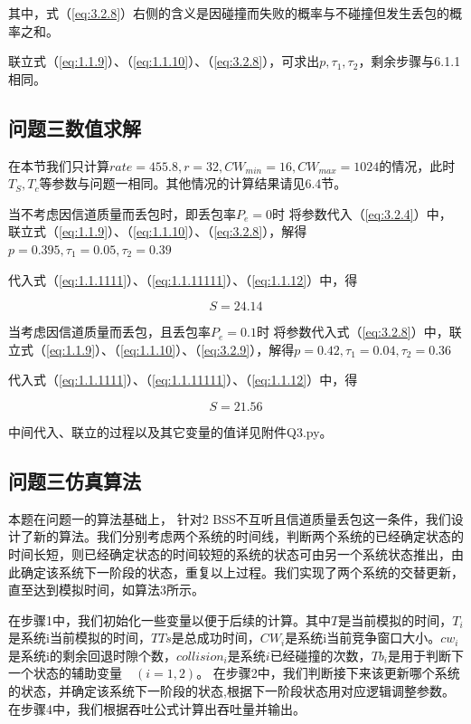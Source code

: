 \documentclass[bwprint]{gmcmthesis}
\begin{document}
其中，式（\ref{eq:3.2.8}）右侧的含义是因碰撞而失败的概率与不碰撞但发生丢包的概率之和。

联立式（\ref{eq:1.1.9}）、（\ref{eq:1.1.10}）、（\ref{eq:3.2.8}），可求出$p,\tau_1,\tau_2$，剩余步骤与6.1.1相同。

\subsection{问题三数值求解}

在本节我们只计算$rate=455.8,r=32,CW_{min}=16,CW_{max}=1024$的情况，此时$T_S,T_c$等参数与问题一相同。其他情况的计算结果请见6.4节。

当不考虑因信道质量而丢包时，即丢包率$P_e=0$时
将参数代入（\ref{eq:3.2.4}）中，联立式（\ref{eq:1.1.9}）、（\ref{eq:1.1.10}）、（\ref{eq:3.2.8}），解得$p=0.395,\tau_1 = 0.05, \tau_2=0.39 $

代入式（\ref{eq:1.1.1111}）、（\ref{eq:1.1.11111}）、（\ref{eq:1.1.12}）中，得

\begin{equation}
    S = 24.14
\end{equation}

当考虑因信道质量而丢包，且丢包率$P_e=0.1$时
将参数代入式（\ref{eq:3.2.8}）中，联立式（\ref{eq:1.1.9}）、（\ref{eq:1.1.10}）、（\ref{eq:3.2.9}），解得$p=0.42,\tau_1 = 0.04, \tau_2=0.36 $

代入式（\ref{eq:1.1.1111}）、（\ref{eq:1.1.11111}）、（\ref{eq:1.1.12}）中，得

\begin{equation}
    S = 21.56
\end{equation}

中间代入、联立的过程以及其它变量的值详见附件Q3.py。

\subsection{问题三仿真算法}

本题在问题一的算法基础上，
针对2 BSS不互听且信道质量丢包这一条件，我们设计了新的算法。我们分别考虑两个系统的时间线，判断两个系统的已经确定状态的时间长短，则已经确定状态的时间较短的系统的状态可由另一个系统状态推出，由此确定该系统下一阶段的状态，重复以上过程。我们实现了两个系统的交替更新，直至达到模拟时间，如算法3所示。

在步骤1中，我们初始化一些变量以便于后续的计算。其中$T$是当前模拟的时间，$T_i$是系统i当前模拟的时间，$TTs$是总成功时间，$CW_i$是系统i当前竞争窗口大小。$cw_i$是系统i的剩余回退时隙个数，$collision_i$是系统$i$已经碰撞的次数，$Tb_i$是用于判断下一个状态的辅助变量\ \ $(i=1,2)$。
在步骤2中，我们判断接下来该更新哪个系统的状态，并确定该系统下一阶段的状态,根据下一阶段状态用对应逻辑调整参数。
在步骤4中，我们根据吞吐公式计算出吞吐量并输出。
\end{document}
